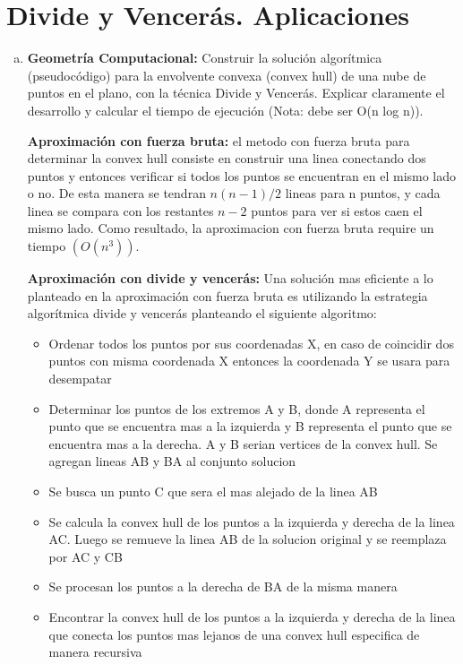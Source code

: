 \newpage
\section{Divide y Vencerás. Aplicaciones}
\begin{enumerate}[a)]
  \item \textbf{Geometría Computacional: }Construir la solución algorítmica (pseudocódigo) para la envolvente convexa (convex hull) de una nube de puntos en el plano, con la técnica Divide y Vencerás. Explicar claramente el desarrollo y calcular el tiempo de ejecución (Nota: debe ser O(n log n)).
  
  \textbf{Aproximación con fuerza bruta: }el metodo con fuerza bruta para determinar la convex hull consiste en construir una linea conectando dos puntos y entonces verificar si todos los puntos se encuentran en el mismo lado o no. De esta manera se tendran $n(n-1)/2$ lineas para n puntos, y cada linea se compara con los restantes $n-2$ puntos para ver si estos caen el mismo lado. Como resultado, la aproximacion con fuerza bruta require un tiempo $(O(n^3))$.

  \textbf{Aproximación con divide y vencerás: }Una solución mas eficiente a lo planteado en la aproximación con fuerza bruta es utilizando la estrategia algorítmica divide y vencerás planteando el siguiente algoritmo:
  \begin{itemize}
    \item Ordenar todos los puntos por sus coordenadas X, en caso de coincidir dos puntos con misma coordenada X entonces la coordenada Y se usara para desempatar
    \item Determinar los puntos de los extremos A y B, donde A representa el punto que se encuentra mas a la izquierda y B representa el punto que se encuentra mas a la derecha. A y B serian vertices de la convex hull. Se agregan lineas AB y BA al conjunto solucion
    \item Se busca un punto C que sera el mas alejado de la linea AB
    \item Se calcula la convex hull de los puntos a la izquierda y derecha de la linea AC. Luego se remueve la linea AB de la solucion original y se reemplaza por AC y CB
    \item Se procesan los puntos a la derecha de BA de la misma manera
    \item Encontrar la convex hull de los puntos a la izquierda y derecha de la linea que conecta los puntos mas lejanos de una convex hull especifica de manera recursiva
  \end{itemize}


\end{enumerate}
